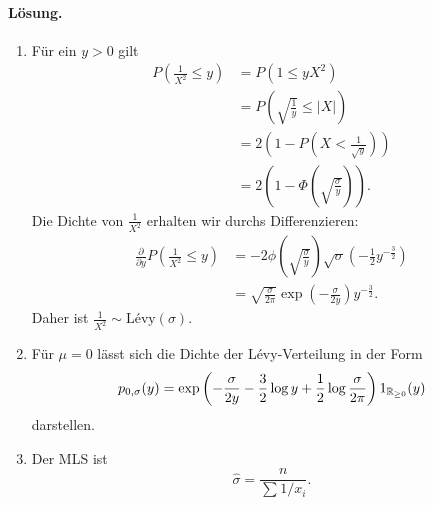 \paragraph*{Lösung.} 
\begin{enumerate}
    \item Für ein $y>0$ gilt
        \begin{align*}
            P \left( \frac{1}{X^{2}} \leq y \right) &= P \left( 1 \leq y X^{2}   \right) \\
            &= P \left( \sqrt{\frac{1}{y}} \leq | X | \right) \\
            &= 2 \left( 1 - P \left( X < \frac{1}{\sqrt{y}} \right) \right) \\
            &= 2 \left( 1 - \Phi\left( \sqrt{ \frac{\sigma}{y}} \right) \right).
        \end{align*}
        Die Dichte von $\frac{1}{X^2}$ erhalten wir durchs Differenzieren:
        \begin{align*}
            \frac{\partial}{\partial y} P \left( \frac{1}{X^2} \leq y \right) &=
            -2 \phi \left( \sqrt{\frac{\sigma}{y}} \right) \sqrt{\sigma} 
            \left( -\frac{1}{2} y^{-\frac{3}{2}} \right) \\
            &= \sqrt{\frac{\sigma}{2 \pi}} \exp \left( - \frac{\sigma}{2 y} \right) y^{-\frac{3}{2}}.
        \end{align*}
        Daher ist $\frac{1}{X^2} \sim \text{L\'evy}(\sigma)$.

    \item Für $\mu=0$ lässt sich die Dichte der L\'evy-Verteilung in der Form
        \begin{equation*}
            p_{0,\sigma}(y) = \exp \left( -\frac{\sigma}{2y} - \frac{3}{2}\log y 
            + \frac{1}{2} \log \frac{\sigma}{2 \pi}  \right) 1_{\mathbb R_{\geq 0}} (y)
        \end{equation*}
        darstellen.

    \item Der MLS ist
        \begin{equation*}
            \hat \sigma = \frac{n}{ \sum_{}^{} 1/x_i}.
        \end{equation*}
\end{enumerate}


